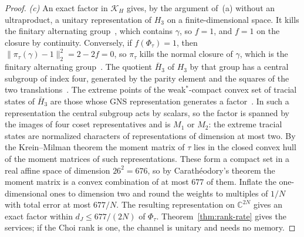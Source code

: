 \documentclass[11pt,a4paper]{article}
\theoremstyle{plain}
\theoremstyle{definition}
\theoremstyle{remark}
\newcommand{\dJ}{d_J}
\begin{document}
\begin{proof}
\emph{(c)} An exact factor in $\mathcal K_H$ gives, by the argument of~(a) without an ultraproduct, a unitary representation of $H_3$ on a
finite-dimensional space. It kills the finitary alternating group~\cite[Remark~2.2]{DouglasMghirbiA}, which contains $\gamma$, so $f=1$, and $f=1$
on the closure by continuity. Conversely, if $f(\Phi_\tau)=1$, then $\|\pi_\tau(\gamma)-1\|_2^2=2-2f=0$, so $\pi_\tau$ kills the normal closure of
$\gamma$, which is the finitary alternating group~\cite[Lemma~2.4]{DouglasMghirbiA}. The quotient $\bar H_3$ of $H_3$ by that group has a central
subgroup of index four, generated by the parity element and the squares of the two translations~\cite[Propositions~2.3 and~2.5]{DouglasMghirbiA}. The
extreme points of the weak$^*$-compact convex set of tracial states of $\bar H_3$ are those whose GNS representation generates a factor~\cite{Dixmier1977}. In
such a representation the central subgroup acts by scalars, so the factor is spanned by the images of four coset representatives and is $M_1$ or
$M_2$: the extreme tracial states are normalized characters of representations of dimension at most two. By the Krein--Milman theorem the moment
matrix of $\tau$ lies in the closed convex hull of the moment matrices of such representations. These form a compact set in a real affine space
of dimension $26^2=676$, so by Carath\'eodory's theorem the moment matrix is a convex combination of at most $677$ of them. Inflate the
one-dimensional ones to dimension two and round the weights to multiples of $1/N$ with total error at most $677/N$. The resulting representation
on $\mathbb C^{2N}$ gives an exact factor within $\dJ\le677/(2N)$ of $\Phi_\tau$. Theorem~\ref{thm:rank-rate} gives the services; if the Choi rank is
one, the channel is unitary and needs no memory.


\end{proof}
\end{document}
